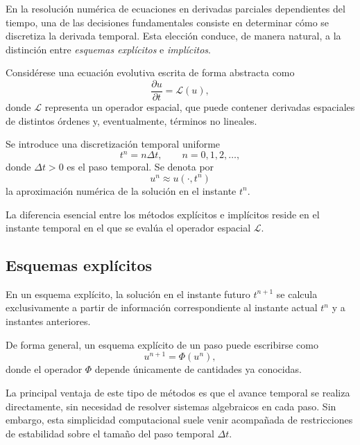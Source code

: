 \documentclass[12pt]{article}
\begin{document}
En la resolución numérica de ecuaciones en derivadas parciales dependientes del tiempo, una de las decisiones fundamentales consiste en determinar cómo se discretiza la derivada temporal. Esta elección conduce, de manera natural, a la distinción entre \emph{esquemas explícitos} e \emph{implícitos}.

Considérese una ecuación evolutiva escrita de forma abstracta como
\begin{equation}
    \frac{\partial u}{\partial t}
    =
    \mathcal{L}(u),
\end{equation}
donde $\mathcal{L}$ representa un operador espacial, que puede contener derivadas espaciales de distintos órdenes y, eventualmente, términos no lineales.

Se introduce una discretización temporal uniforme
\begin{equation}
    t^n = n\Delta t,
    \qquad
    n=0,1,2,\ldots,
\end{equation}
donde $\Delta t>0$ es el paso temporal. Se denota por
\begin{equation}
    u^n \approx u(\cdot,t^n)
\end{equation}
la aproximación numérica de la solución en el instante $t^n$.

La diferencia esencial entre los métodos explícitos e implícitos reside en el instante temporal en el que se evalúa el operador espacial $\mathcal{L}$.

\subsection*{Esquemas explícitos}

En un esquema explícito, la solución en el instante futuro $t^{n+1}$ se calcula exclusivamente a partir de información correspondiente al instante actual $t^n$ y a instantes anteriores.

De forma general, un esquema explícito de un paso puede escribirse como
\begin{equation}
    u^{n+1}
    =
    \Phi(u^n),
\end{equation}
donde el operador $\Phi$ depende únicamente de cantidades ya conocidas.

La principal ventaja de este tipo de métodos es que el avance temporal se realiza directamente, sin necesidad de resolver sistemas algebraicos en cada paso. Sin embargo, esta simplicidad computacional suele venir acompañada de restricciones de estabilidad sobre el tamaño del paso temporal $\Delta t$.
\end{document}
